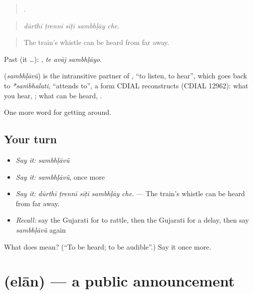\begin{quote}
    .
\end{quote}

\begin{quote}
\emph{dūrthī ṭrennī sīṭī sambhḷāy che.}
\end{quote}

\begin{quote}
The train's whistle can be heard from far away.
\end{quote}

Past (it …):   , \emph{te avāj sambhḷāyo}.

\begin{cousinweb}
\textbf{} (\emph{sambhḷāvũ}) is the intransitive partner of , \textquotedblleft{}to listen, to hear\textquotedblright{}, which goes back to \emph{*saṁbhalati}, \textquotedblleft{}attends to\textquotedblright{}, a form CDIAL reconstructs (CDIAL 12962): what you hear, ; what can be heard, .
\end{cousinweb}

\begin{grammarlens}[title={What you've built}]
One more word for getting around.
\end{grammarlens}

\subsection*{Your turn}
\begin{itemize}
\raggedright
  \item \emph{Say it:} \emph{sambhḷāvũ}
  \item \emph{Say it:} \emph{sambhḷāvũ}, once more
  \item \emph{Say it:} \emph{dūrthī ṭrennī sīṭī sambhḷāy che.} — The train's whistle can be heard from far away.
  \item \emph{Recall:} say the Gujarati for to rattle, then the Gujarati for a delay, then say \emph{sambhḷāvũ} again
\end{itemize}

\begin{tcolorbox}[breakable,colback=teal!4,colframe=teal!35!black,title={Before you move on}]
What does  mean? (\textquotedblleft{}To be heard; to be audible\textquotedblright{}.) Say it once more.
\end{tcolorbox}
\section[\texorpdfstring{\gu{એલાન} (elān)}{એલાન (elān)}]{ (elān) — a public announcement}

